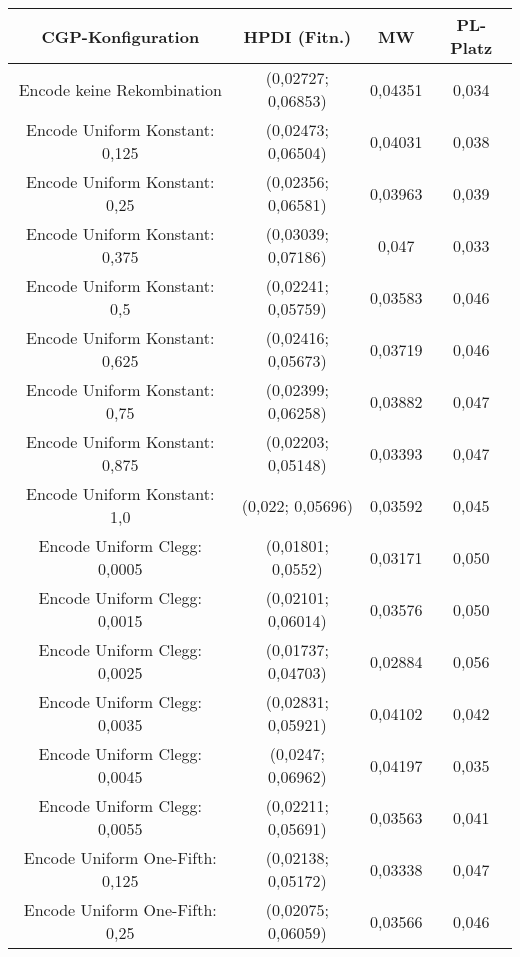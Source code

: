  \begin{table}[H]
	\centering
	\begin{tabular}{c | c | c | c}
		\textbf{CGP-Konfiguration} & \textbf{HPDI (Fitn.)} & \textbf{MW} & \textbf{PL-Platz}\\
		\hline
		Encode keine Rekombination & (0,02727; 0,06853) &\color{red} 0,04351\color{black} & \color{red}0,034\color{black}\\
		\hline
		\hline
		Encode Uniform Konstant: 0,125 & (0,02473; 0,06504) & 0,04031 & 0,038\\
		\hline
		Encode Uniform Konstant: 0,25 & \color{red}(0,02356; 0,06581)\color{black} & 0,03963 & 0,039\\
		\hline
		Encode Uniform Konstant: 0,375 & (0,03039; 0,07186) & \color{red}0,047\color{black} & \color{red}0,033\color{black}\\
		\hline
		Encode Uniform Konstant: 0,5 & (0,02241; 0,05759) & 0,03583 & 0,046\\
		\hline
		Encode Uniform Konstant: 0,625 & (0,02416; 0,05673) & 0,03719 & 0,046\\
		\hline
		Encode Uniform Konstant: 0,75 & (0,02399; 0,06258) & 0,03882 & 0,047\\
		\hline
		Encode Uniform Konstant: 0,875 & \color{Green}(0,02203; 0,05148)\color{black} & 0,03393 & 0,047\\
		\hline
		Encode Uniform Konstant: 1,0 & (0,022; 0,05696) & 0,03592 & 0,045\\
		\hline
		\hline
		Encode Uniform Clegg: 0,0005 & (0,01801; 0,0552) & \color{Green}0,03171\color{black} & \color{Green}0,050\color{black}\\
		\hline
		Encode Uniform Clegg: 0,0015 & (0,02101; 0,06014) & 0,03576 & 0,050\\
		\hline
		Encode Uniform Clegg: 0,0025 & \color{Green}(0,01737; 0,04703)\color{black} & \color{Green}0,02884\color{black} & \color{Green}0,056\color{black}\\
		\hline
		Encode Uniform Clegg: 0,0035 & (0,02831; 0,05921) & 0,04102 & 0,042\\
		\hline
		Encode Uniform Clegg: 0,0045 & \color{red}(0,0247; 0,06962)\color{black} & 0,04197 & 0,035\\
		\hline
		Encode Uniform Clegg: 0,0055 & (0,02211; 0,05691) & 0,03563 & 0,041\\
		\hline
		\hline
		Encode Uniform One-Fifth: 0,125 & (0,02138; 0,05172) & 0,03338 & 0,047\\
		\hline
		Encode Uniform One-Fifth: 0,25 & (0,02075; 0,06059) & 0,03566 & 0,046\\

\end{tabular}
\end{table}
